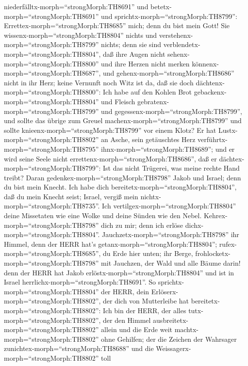 niederfälltx-morph=``strongMorph:TH8691'' und
betetx-morph=``strongMorph:TH8691'' und
sprichtx-morph=``strongMorph:TH8799'':
Errettex-morph=``strongMorph:TH8685'' mich; denn du bist mein Gott!
 Sie wissenx-morph=``strongMorph:TH8804'' nichts und
verstehenx-morph=``strongMorph:TH8799'' nichts; denn sie sind
verblendetx-morph=``strongMorph:TH8804'', daß ihre Augen nicht
sehenx-morph=``strongMorph:TH8800'' und ihre Herzen nicht merken
könnenx-morph=``strongMorph:TH8687'',  und
gehenx-morph=``strongMorph:TH8686'' nicht in ihr Herz; keine Vernunft
noch Witz ist da, daß sie doch dächtenx-morph=``strongMorph:TH8800'':
Ich habe auf den Kohlen Brot gebackenx-morph=``strongMorph:TH8804'' und
Fleisch gebratenx-morph=``strongMorph:TH8799'' und
gegessenx-morph=``strongMorph:TH8799'', und sollte das übrige zum Greuel
machenx-morph=``strongMorph:TH8799'' und sollte
knieenx-morph=``strongMorph:TH8799'' vor einem Klotz?  Er
hat Lustx-morph=``strongMorph:TH8802'' an Asche, sein getäuschtes Herz
verführtx-morph=``strongMorph:TH8795''
ihnx-morph=``strongMorph:TH8689''; und er wird seine Seele nicht
errettenx-morph=``strongMorph:TH8686'', daß er
dächtex-morph=``strongMorph:TH8799'': Ist das nicht Trügerei, was meine
rechte Hand treibt?  Daran
gedenkex-morph=``strongMorph:TH8798'' Jakob und Israel; denn du bist
mein Knecht. Ich habe dich bereitetx-morph=``strongMorph:TH8804'', daß
du mein Knecht seist; Israel, vergiß mein
nichtx-morph=``strongMorph:TH8735''.  Ich
vertilgex-morph=``strongMorph:TH8804'' deine Missetaten wie eine Wolke
und deine Sünden wie den Nebel. Kehrex-morph=``strongMorph:TH8798'' dich
zu mir; denn ich erlöse dichx-morph=``strongMorph:TH8804''.
 Jauchzetx-morph=``strongMorph:TH8798'' ihr Himmel, denn
der HERR hat's getanx-morph=``strongMorph:TH8804'';
rufex-morph=``strongMorph:TH8685'', du Erde hier unten; ihr Berge,
frohlocketx-morph=``strongMorph:TH8798'' mit Jauchzen, der Wald und alle
Bäume darin! denn der HERR hat Jakob
erlöstx-morph=``strongMorph:TH8804'' und ist in Israel
herrlichx-morph=``strongMorph:TH8691''.  So
sprichtx-morph=``strongMorph:TH8804'' der HERR, dein
Erlöserx-morph=``strongMorph:TH8802'', der dich von Mutterleibe hat
bereitetx-morph=``strongMorph:TH8802'': Ich bin der HERR, der alles
tutx-morph=``strongMorph:TH8802'', der den Himmel
ausbreitetx-morph=``strongMorph:TH8802'' allein und die Erde weit
machtx-morph=``strongMorph:TH8802'' ohne Gehilfen;  der die
Zeichen der Wahrsager zunichtex-morph=``strongMorph:TH8688'' und die
Weissagerx-morph=``strongMorph:TH8802'' toll
